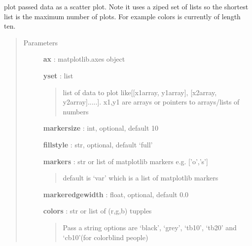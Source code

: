 \documentclass[letterpaper,10pt,english]{sphinxmanual}
\begin{document}

\begin{fulllineitems}
\label{pubplots:pubplots.plot.plot_scatter}
plot passed data as a scatter plot. Note it uses a ziped set of lists so the shortest
list is the maximum number of plots. For example colors is currently of length ten.
\begin{quote}\begin{description}
\item[{Parameters}] \leavevmode
\textbf{ax} : matplotlib.axes object

\textbf{yset} : list
\begin{quote}

list of data to plot like{[}{[}x1array, y1array{]}, {[}x2array, y2array{]}.....{]}.
x1,y1 are arrays or pointers to arrays/lists of numbers
\end{quote}

\textbf{markersize} : int, optional, default 10

\textbf{fillstyle} : str, optional, default `full'

\textbf{markers} : str or list of matplotlib markers e.g. {[}'o','s'{]}
\begin{quote}

default is `var' which is a list of matplotlib markers
\end{quote}

\textbf{markeredgewidth} : float, optional, default 0.0

\textbf{colors} : str or list of (r,g,b) tupples
\begin{quote}

Pass a string options are `black', `grey', `tb10', `tb20' and `cb10'(for colorblind people)
\end{quote}

\end{description}\end{quote}

\end{fulllineitems}

\end{document}
